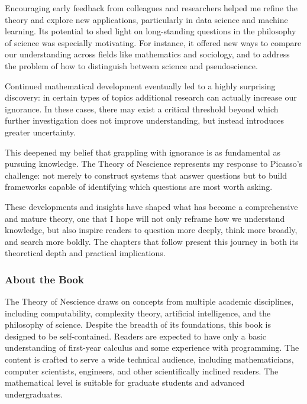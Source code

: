 Encouraging early feedback from colleagues and researchers helped me refine the theory and explore new applications, particularly in data science and machine learning. Its potential to shed light on long-standing questions in the philosophy of science was especially motivating. For instance, it offered new ways to compare our understanding across fields like mathematics and sociology, and to address the problem of how to distinguish between science and pseudoscience.

Continued mathematical development eventually led to a highly surprising discovery: in certain types of topics additional research can actually increase our ignorance. In these cases, there may exist a critical threshold beyond which further investigation does not improve understanding, but instead introduces greater uncertainty.

This deepened my belief that grappling with ignorance is as fundamental as pursuing knowledge. The Theory of Nescience represents my response to Picasso's challenge: not merely to construct systems that answer questions but to build frameworks capable of identifying which questions are most worth asking.

These developments and insights have shaped what has become a comprehensive and mature theory, one that I hope will not only reframe how we understand knowledge, but also inspire readers to question more deeply, think more broadly, and search more boldly. The chapters that follow present this journey in both its theoretical depth and practical implications.

%
%

\subsubsection*{About the Book}

The Theory of Nescience draws on concepts from multiple academic disciplines, including computability, complexity theory, artificial intelligence, and the philosophy of science. Despite the breadth of its foundations, this book is designed to be self-contained. Readers are expected to have only a basic understanding of first-year calculus and some experience with programming. The content is crafted to serve a wide technical audience, including mathematicians, computer scientists, engineers, and other scientifically inclined readers. The mathematical level is suitable for graduate students and advanced undergraduates.

